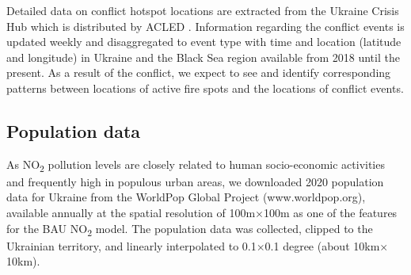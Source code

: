 Detailed data on conflict hotspot locations are extracted from the Ukraine Crisis Hub which is distributed by ACLED \citep{raleigh2010introducing}. Information regarding the conflict events is updated weekly and disaggregated to event type with time and location (latitude and longitude) in Ukraine and the Black Sea region available from 2018 until the present. As a result of the conflict, we expect to see and identify corresponding patterns between locations of active fire spots and the locations of conflict events. \par
\subsection{Population data}
As NO\textsubscript{2} pollution levels are closely related to human socio-economic activities and frequently high in populous urban areas, we downloaded 2020 population data for Ukraine from the WorldPop Global Project (www.worldpop.org), available annually at the spatial resolution of 100m$\times$100m as one of the features for the BAU NO\textsubscript{2} model. The population data was collected, clipped to the Ukrainian territory, and linearly interpolated to 0.1$\times$0.1 degree (about 10km$\times$10km).\par
